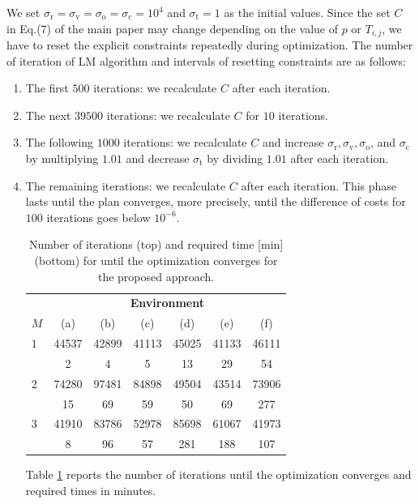 \documentclass[letterpaper]{article} %
\begin{document}
We set $\sigma_{\mathrm{r}}=\sigma_{\mathrm{v}}=\sigma_{\mathrm{o}}=\sigma_{\mathrm{c}}=10^4$ and $\sigma_{\mathrm{t}}=1$ as the initial values. Since the set $C$ in Eq.(7) of the main paper may change depending on the value of $p$ or $T_{i,j}$, we have to reset the explicit constraints repeatedly during optimization. The number of iteration of LM algorithm and intervals of resetting constraints are as follows:
\begin{enumerate}
\item The first $500$ iterations: we recalculate $C$ after each iteration.
\item The next $39500$ iterations: we recalculate $C$ for $10$ iterations.
\item The following $1000$ iterations: we recalculate $C$
and increase $\sigma_{\mathrm{r}}, \sigma_{\mathrm{v}}, \sigma_{\mathrm{o}}$, and  $\sigma_{\mathrm{c}}$ by multiplying $1.01$ and decrease $\sigma_{\mathrm{t}}$ by dividing $1.01$ after each iteration.
\item The remaining iterations: we recalculate $C$ after each iteration. This phase lasts until the plan converges, more precisely, until the difference of costs for $100$ iterations goes below $10^{-6}$.

\begin{table}[t]
    \centering
    \begin{tabularx}{\linewidth}{l|cccccc}
    \toprule[1pt]
    & \multicolumn{6}{c}{\textbf{Environment}}\\
    $M$&(a)&(b)&(c)&(d)&(e)&(f)\\
    \midrule
         $1$& 44537& 42899& 41113& 45025& 41133 & 46111 \\
         & 2& 4& 5& 13 & 29 &54 \\
    \midrule
         $2$& 74280& 97481& 84898& 49504& 43514& 73906\\
         & 15& 69& 59& 50& 69& 277\\
    \midrule
         $3$& 41910& 83786& 52978& 85698 & 61067& 41973\\
         & 8& 96& 57& 281 & 188& 107\\
    \bottomrule[1pt]
    \end{tabularx}
    \caption{Number of iterations (top) and required time [min] (bottom) for until the optimization converges for the proposed approach.}
    \label{tab:number of iterations}
\end{table}

Table \ref{tab:number of iterations} reports the number of iterations until the optimization converges and required times in minutes.

\end{enumerate}
\end{document}
